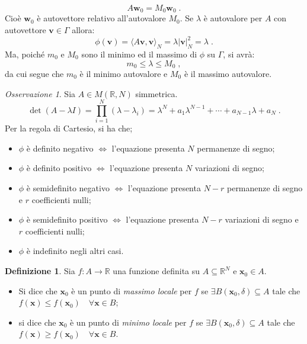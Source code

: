 \documentclass[a4paper,12pt]{report}
\theoremstyle{plain}
\theoremstyle{definition}
\newtheorem{defn}{Definizione}[section]
\theoremstyle{remark}
\newtheorem{oss}{Osservazione}[section]
\numberwithin{equation}{section}
\begin{document}
\begin{equation}
A\mathbf{w}_0 = M_0\mathbf{w}_0\;.
\end{equation}
Cioè $\mathbf{w}_0$ è autovettore relativo all'autovalore $M_0$. Se $\lambda$ è autovalore per $A$ con autovettore $\mathbf{v} \in 
\Gamma$ allora:
\begin{equation}
\phi(\mathbf{v})=\langle A\mathbf{v},\mathbf{v}\rangle_N = \lambda |\mathbf{v}|_N^2=\lambda\;.
\end{equation}
Ma, poiché $m_0$ e $M_0$ sono il minimo ed il massimo di $\phi$ su $\Gamma$, si avrà:
\begin{equation}
m_0 \le \lambda \le M_0\;,
\end{equation}
da cui segue che $m_0$ è il minimo autovalore e $M_0$ è il massimo autovalore.
\endproof
\begin{oss} Sia $A \in M(\mathbb{R},N)$ simmetrica.
\begin{equation}
\det(A-\lambda I)=\prod_{i=1}^N (\lambda-\lambda_i)=\lambda^N+a_1\lambda^{N-1}+\cdots+a_{N-1}\lambda+a_N\;.
\end{equation}
Per la regola di Cartesio, si ha che;
\begin{itemize}
 \item $\phi$ è definito negativo $\Longleftrightarrow$ l'equazione presenta $N$ permanenze di segno;
 \item $\phi$ è definito positivo $\Longleftrightarrow$ l'equazione presenta $N$ variazioni di segno;
 \item $\phi$ è semidefinito negativo $\Longleftrightarrow$ l'equazione presenta $N-r$ permanenze di segno e $r$ coefficienti nulli;
 \item $\phi$ è semidefinito positivo $\Longleftrightarrow$ l'equazione presenta $N-r$ variazioni di segno e $r$ coefficienti nulli;
 \item $\phi$ è indefinito negli altri casi.
\end{itemize}
\end{oss}
\begin{defn} Sia $f:A \to \mathbb{R}$ una funzione definita su $A \subseteq \mathbb{R}^N$ e $\mathbf{x}_0 \in A$.
\begin{itemize}
 \item Si dice che $\mathbf{x}_0$ è un punto di \textit{massimo locale} per $f$ se $\exists B(\mathbf{x}_0,\delta)\subseteq A$ tale che 
$f(\mathbf{x})\le f(\mathbf{x}_0) \quad \forall \mathbf{x} \in B$;
 \item si dice che $\mathbf{x}_0$ è un punto di \textit{minimo locale} per $f$ se $\exists B(\mathbf{x}_0,\delta)\subseteq A$ tale che 
$f(\mathbf{x})\ge f(\mathbf{x}_0) \quad \forall \mathbf{x} \in B$.
\end{itemize}
\end{defn}
\end{document}
